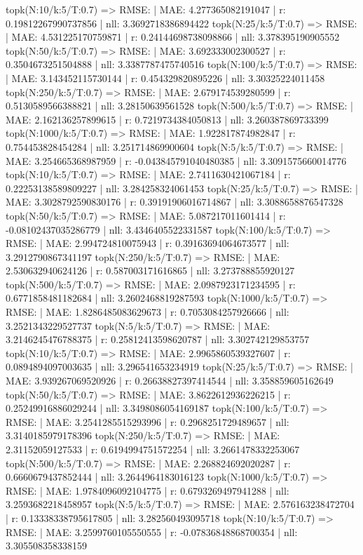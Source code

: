 topk(N:10/k:5/T:0.7) => RMSE: | MAE: 4.277365082191047 | r: 0.19812267990737856 | nll: 3.3692718386894422
topk(N:25/k:5/T:0.7) => RMSE: | MAE: 4.531225170759871 | r: 0.24144698738098866 | nll: 3.378395190905552
topk(N:50/k:5/T:0.7) => RMSE: | MAE: 3.692333002300527 | r: 0.3504673251504888 | nll: 3.3387787475740516
topk(N:100/k:5/T:0.7) => RMSE: | MAE: 3.143452115730144 | r: 0.454329820895226 | nll: 3.30325224011458
topk(N:250/k:5/T:0.7) => RMSE: | MAE: 2.679174539280599 | r: 0.5130589566388821 | nll: 3.28150639561528
topk(N:500/k:5/T:0.7) => RMSE: | MAE: 2.162136257899615 | r: 0.7219734384050813 | nll: 3.260387869733399
topk(N:1000/k:5/T:0.7) => RMSE: | MAE: 1.922817874982847 | r: 0.754453828454284 | nll: 3.251714869900604
topk(N:5/k:5/T:0.7) => RMSE: | MAE: 3.254665368987959 | r: -0.043845791040480385 | nll: 3.3091575660014776
topk(N:10/k:5/T:0.7) => RMSE: | MAE: 2.7411630421067184 | r: 0.22253138589809227 | nll: 3.284258324061453
topk(N:25/k:5/T:0.7) => RMSE: | MAE: 3.3028792590830176 | r: 0.39191906016714867 | nll: 3.3088658876547328
topk(N:50/k:5/T:0.7) => RMSE: | MAE: 5.087217011601414 | r: -0.08102437035286779 | nll: 3.4346405522331587
topk(N:100/k:5/T:0.7) => RMSE: | MAE: 2.994724810075943 | r: 0.39163694064673577 | nll: 3.2912790867341197
topk(N:250/k:5/T:0.7) => RMSE: | MAE: 2.530632940624126 | r: 0.587003171616865 | nll: 3.273788855920127
topk(N:500/k:5/T:0.7) => RMSE: | MAE: 2.0987923171234595 | r: 0.6771858481182684 | nll: 3.2602468819287593
topk(N:1000/k:5/T:0.7) => RMSE: | MAE: 1.8286485083629673 | r: 0.7053084257926666 | nll: 3.2521343229527737
topk(N:5/k:5/T:0.7) => RMSE: | MAE: 3.2146245476788375 | r: 0.25812413598620787 | nll: 3.302742129853757
topk(N:10/k:5/T:0.7) => RMSE: | MAE: 2.9965860539327607 | r: 0.0894894097003635 | nll: 3.296541653234919
topk(N:25/k:5/T:0.7) => RMSE: | MAE: 3.939267069520926 | r: 0.26638827397414544 | nll: 3.358859605162649
topk(N:50/k:5/T:0.7) => RMSE: | MAE: 3.8622612936226215 | r: 0.25249916886029244 | nll: 3.3498086054169187
topk(N:100/k:5/T:0.7) => RMSE: | MAE: 3.2541285515293996 | r: 0.2968251729489657 | nll: 3.3140185979178396
topk(N:250/k:5/T:0.7) => RMSE: | MAE: 2.31152059127533 | r: 0.6194994751572254 | nll: 3.2661478332253067
topk(N:500/k:5/T:0.7) => RMSE: | MAE: 2.268824692020287 | r: 0.6660679437852444 | nll: 3.2644964183016123
topk(N:1000/k:5/T:0.7) => RMSE: | MAE: 1.9784096092104775 | r: 0.6793269497941288 | nll: 3.2593682218458957
topk(N:5/k:5/T:0.7) => RMSE: | MAE: 2.576163238472704 | r: 0.13338338795617805 | nll: 3.282560493095718
topk(N:10/k:5/T:0.7) => RMSE: | MAE: 3.2599760105550555 | r: -0.07836848868700354 | nll: 3.305508358338159

